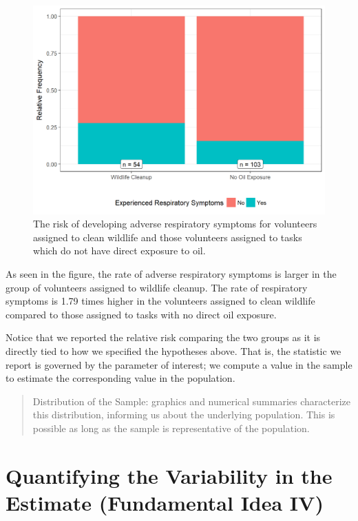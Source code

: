 \documentclass[]{book}
\theoremstyle{plain}
\theoremstyle{mydefn}
\theoremstyle{myexmpl}
\theoremstyle{remark}
\begin{document}
\begin{figure}

{\centering \includegraphics[width=0.8\linewidth]{./Images/recaplanguage-deepwater-plot-1} 

}

\caption{The risk of developing adverse respiratory symptoms for volunteers assigned to clean wildlife and those volunteers assigned to tasks which do not have direct exposure to oil.}\label{fig:recaplanguage-deepwater-plot}
\end{figure}

As seen in the figure, the rate of adverse respiratory symptoms is
larger in the group of volunteers assigned to wildlife cleanup. The rate
of respiratory symptoms is 1.79 times higher in the volunteers assigned
to clean wildlife compared to those assigned to tasks with no direct oil
exposure.

Notice that we reported the relative risk comparing the two groups as it
is directly tied to how we specified the hypotheses above. That is, the
statistic we report is governed by the parameter of interest; we compute
a value in the sample to estimate the corresponding value in the
population.

\begin{quote}
Distribution of the Sample: graphics and numerical summaries
characterize this distribution, informing us about the underlying
population. This is possible as long as the sample is representative of
the population.
\end{quote}

\section{Quantifying the Variability in the Estimate (Fundamental Idea
IV)}\label{quantifying-the-variability-in-the-estimate-fundamental-idea-iv}
\end{document}

